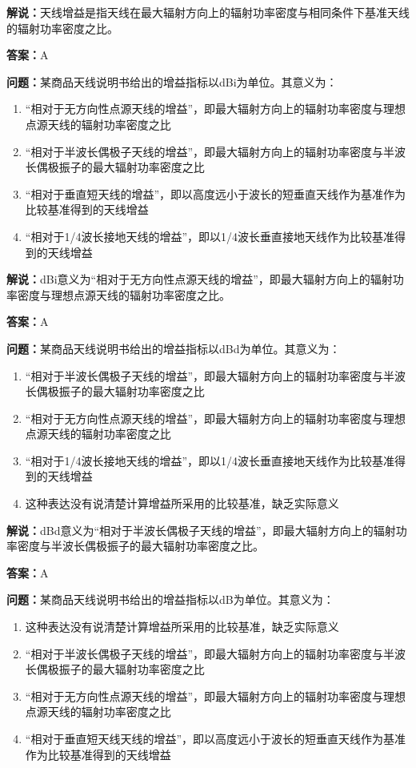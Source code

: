 \textbf{解说：}天线增益是指天线在最大辐射方向上的辐射功率密度与相同条件下基准天线的辐射功率密度之比。%

\textbf{答案：}A

\textbf{问题：}某商品天线说明书给出的增益指标以dBi为单位。其意义为：
\begin{enumerate}[label=\Alph*), leftmargin=3em]
	\item “相对于无方向性点源天线的增益”，即最大辐射方向上的辐射功率密度与理想点源天线的辐射功率密度之比
	\item “相对于半波长偶极子天线的增益”，即最大辐射方向上的辐射功率密度与半波长偶极振子的最大辐射功率密度之比
	\item “相对于垂直短天线的增益”，即以高度远小于波长的短垂直天线作为基准作为比较基准得到的天线增益
	\item “相对于1/4波长接地天线的增益”，即以1/4波长垂直接地天线作为比较基准得到的天线增益
\end{enumerate}

\textbf{解说：}dBi意义为“相对于无方向性点源天线的增益”，即最大辐射方向上的辐射功率密度与理想点源天线的辐射功率密度之比。%

\textbf{答案：}A

\textbf{问题：}某商品天线说明书给出的增益指标以dBd为单位。其意义为：

\begin{enumerate}[label=\Alph*), leftmargin=3em]
	\item “相对于半波长偶极子天线的增益”，即最大辐射方向上的辐射功率密度与半波长偶极振子的最大辐射功率密度之比
	\item “相对于无方向性点源天线的增益”，即最大辐射方向上的辐射功率密度与理想点源天线的辐射功率密度之比
	\item “相对于1/4波长接地天线的增益”，即以1/4波长垂直接地天线作为比较基准得到的天线增益
	\item 这种表达没有说清楚计算增益所采用的比较基准，缺乏实际意义
\end{enumerate}

\textbf{解说：}dBd意义为“相对于半波长偶极子天线的增益”，即最大辐射方向上的辐射功率密度与半波长偶极振子的最大辐射功率密度之比。%

\textbf{答案：}A

\textbf{问题：}某商品天线说明书给出的增益指标以dB为单位。其意义为：

\begin{enumerate}[label=\Alph*), leftmargin=3em]
	\item 这种表达没有说清楚计算增益所采用的比较基准，缺乏实际意义
	\item “相对于半波长偶极子天线的增益”，即最大辐射方向上的辐射功率密度与半波长偶极振子的最大辐射功率密度之比
	\item “相对于无方向性点源天线的增益”，即最大辐射方向上的辐射功率密度与理想点源天线的辐射功率密度之比
	\item “相对于垂直短天线天线的增益”，即以高度远小于波长的短垂直天线作为基准作为比较基准得到的天线增益
\end{enumerate}

